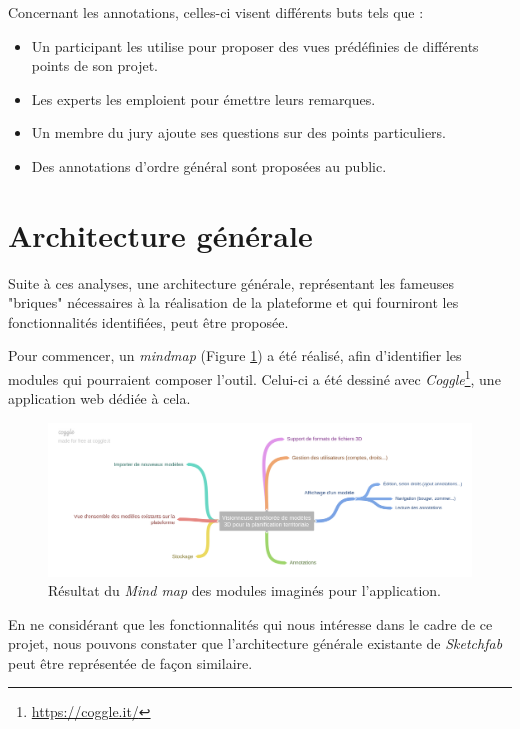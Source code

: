 Concernant les annotations, celles-ci visent différents buts tels que :
\begin{itemize}
    \item Un participant les utilise pour proposer des vues prédéfinies de différents points de son projet.
    \item Les experts les emploient pour émettre leurs remarques.
    \item Un membre du jury ajoute ses questions sur des points particuliers.
    \item Des annotations d'ordre général sont proposées au public.
\end{itemize}

\section{Architecture générale}

Suite à ces analyses, une architecture générale, représentant les fameuses "briques" nécessaires à la réalisation de la plateforme et qui fourniront les fonctionnalités identifiées, peut être proposée.

Pour commencer, un \textit{mindmap} (Figure \ref{fig:mip-viewer-mindmap}) a été réalisé, afin d'identifier les modules qui pourraient composer l'outil.
Celui-ci a été dessiné avec \textit{Coggle}\footnote{\url{https://coggle.it/}}, une application web dédiée à cela.

\begin{figure}[h]
    \centering
    \includegraphics[width=\linewidth]{Figures/mip-viewer-mindmap.png}
    \captionsetup{width=0.9\textwidth}
    \caption{Résultat du \textit{Mind map} des modules imaginés pour l'application.}
    \label{fig:mip-viewer-mindmap}
\end{figure}

En ne considérant que les fonctionnalités qui nous intéresse dans le cadre de ce projet, nous pouvons constater que l'architecture générale existante de \textit{Sketchfab} peut être représentée de façon similaire.

